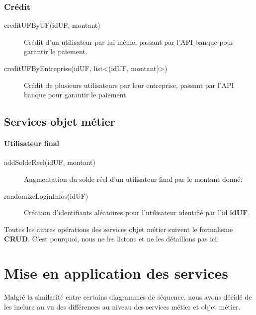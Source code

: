\subsubsection{Crédit}

\begin{description}
  \item[creditUFByUF(idUF, montant)] Crédit d'un utilisateur par lui-même,
    passant par l'API banque pour garantir le paiement.
  \item[creditUFByEntreprise(idUF, list<(idUF, montant)>)] Crédit de plusieurs
    utilisateurs par leur entreprise, passant par l'API banque pour garantir le
    paiement.
\end{description}

\subsection{Services objet métier}

\paragraph{Utilisateur final}

\begin{description}
  \item[addSoldeReel(idUF, montant)] Augmentation du solde réel d'un
    utilisateur final par le montant donné.
  \item[randomizeLoginInfos(idUF)] Création d'identifiants aléatoires pour
    l'utilisateur identifié par l'id \textbf{idUF}.
\end{description}

Toutes les autres opérations des services objet métier suivent le formalisme
\textbf{CRUD}. C'est pourquoi, nous ne les listons et ne les détaillons pas
ici.

\section{Mise en application des services}

Malgré la similarité entre certains diagrammes de séquence, nous avons décidé
de les inclure au vu des différences au niveau des services métier et objet
métier. \\

